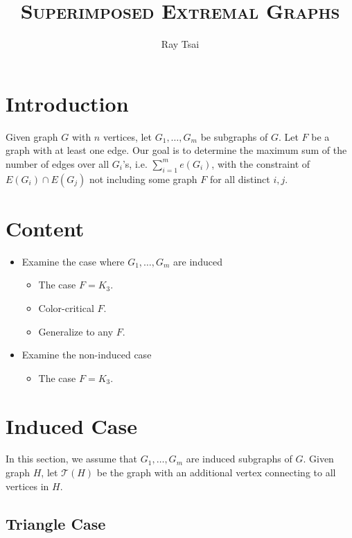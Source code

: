 \documentclass[a4paper]{article}
\title{\textsc{Superimposed Extremal Graphs}}
\author{Ray Tsai}
\date{}
\begin{document}
\maketitle
                                                                                                                                
\section{Introduction}

Given graph $G$ with $n$ vertices, let $G_1, \ldots, G_m$ be subgraphs of $G$. Let $F$ be a graph
with at least one edge. Our goal is to determine the maximum sum of the number of edges over all
$G_i$'s, i.e. $\sum_{i = 1}^m e(G_i)$, with the constraint of $E(G_i) \cap E(G_j)$ not including
some graph $F$ for all distinct $i, j$. 

\section{Content}

\begin{itemize}
  \item Examine the case where $G_1, \ldots, G_m$ are induced
  \begin{itemize}
    \item The case $F = K_3$.
    \item Color-critical $F$.
    \item Generalize to any $F$.
  \end{itemize}
  \item Examine the non-induced case
  \begin{itemize}
    \item The case $F = K_3$.
  \end{itemize}
\end{itemize}


\section{Induced Case}

In this section, we assume that $G_1, \ldots, G_m$ are induced subgraphs of $G$. Given graph $H$,
let $\mathcal{T}(H)$ be the graph with an additional vertex connecting to all vertices in $H$.

\subsection{Triangle Case}
\end{document}
